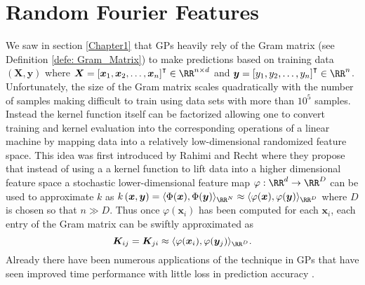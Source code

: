 \section{Random Fourier Features}\label{Chapter3}
We saw in section \ref{Chapter1} that GPs heavily rely of the Gram matrix (see Definition \ref{defe: Gram_Matrix}) to make predictions based on training data $\left( \bm{X} , \bm{y} \right)$ where $\bm{X} = \left[ \bm{x}_1 , \bm{x}_2 , \ldots , \bm{x}_n \right]^{\intercal} \in \RR^{n \times d}$ and $\bm{y} = \left[ y_1 , y_2 , \ldots , y_n \right]^{\intercal} \in \RR^{n}$. Unfortunately, the size of the Gram matrix scales quadratically with the number of samples making difficult to train using data sets with more than $10^5$ samples. Instead the kernel function itself can be factorized allowing one to convert training and kernel evaluation into the corresponding operations of a linear machine by mapping data into a relatively low-dimensional randomized feature space. This idea was first introduced by Rahimi and Recht \cite{NIPS2007_013a006f} where they propose that instead of using a a kernel function to lift data into a higher dimensional feature space a stochastic lower-dimensional feature map $\varphi : \RR^d \to \RR^D$ can be used to approximate $k$ as $k \left( \bm{x} , \bm{y} \right) = \langle \Phi (\bm{x}) , \Phi (\bm{y}) \rangle_{\RR^N} \approx \langle \varphi (\bm{x}) , \varphi (\bm{y}) \rangle_{\RR^D}$ where $D$ is chosen so that $n \gg  D$. Thus once $\varphi (\bm{x}_i)$ has been computed for each $\bm{x}_i$, each entry of the Gram matrix can be swiftly approximated as
\[
    \bm{K}_{ij} = \bm{K}_{ji} \approx \langle \varphi (\bm{x}_i) , \varphi (\bm{y}_j) \rangle_{\RR^D}.
\]
Already there have been numerous applications of the technique in GPs that have seen improved time performance with little loss in prediction accuracy \cite{PotapczynskiAndres2021BSGP}.

